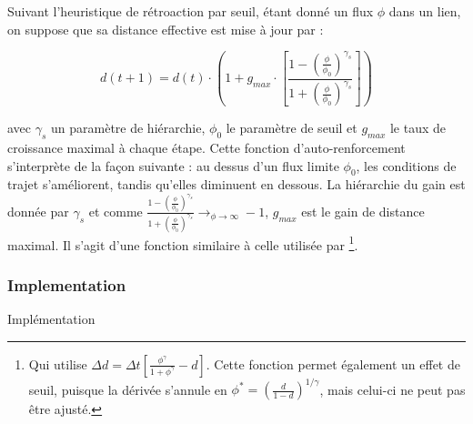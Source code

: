 Suivant l'heuristique de rétroaction par seuil, étant donné un flux $\phi$ dans un lien, on suppose que sa distance effective est mise à jour par :

\[
d(t+1) = d(t)\cdot \left( 1 + g_{max} \cdot \left[\frac{1 - \left(\frac{\phi}{\phi_0}\right)^{\gamma_s}}{1 + \left(\frac{\phi}{\phi_0}\right)^{\gamma_s}}\right]\right)
\]


avec $\gamma_s$ un paramètre de hiérarchie, $\phi_0$ le paramètre de seuil et $g_{max}$ le taux de croissance maximal à chaque étape. Cette fonction d'auto-renforcement s'interprète de la façon suivante : au dessus d'un flux limite $\phi_0$, les conditions de trajet s'améliorent, tandis qu'elles diminuent en dessous. La hiérarchie du gain est donnée par $\gamma_s$ et comme $\frac{1 - \left(\frac{\phi}{\phi_0}\right)^{\gamma_s}}{1 + \left(\frac{\phi}{\phi_0}\right)^{\gamma_s}} \rightarrow_{\phi\rightarrow \infty} -1$, $g_{max}$ est le gain de distance maximal. Il s'agit d'une fonction similaire à celle utilisée par \cite{tero2007mathematical}\footnote{Qui utilise $\Delta d = \Delta t \left[ \frac{\phi^\gamma}{1 + \phi^\gamma} - d\right]$. Cette fonction permet également un effet de seuil, puisque la dérivée s'annule en $\phi^{\ast} = \left(\frac{d}{1 - d}\right)^{1/\gamma}$, mais celui-ci ne peut pas être ajusté.}.





\subsubsection{Implementation}{Implémentation}




